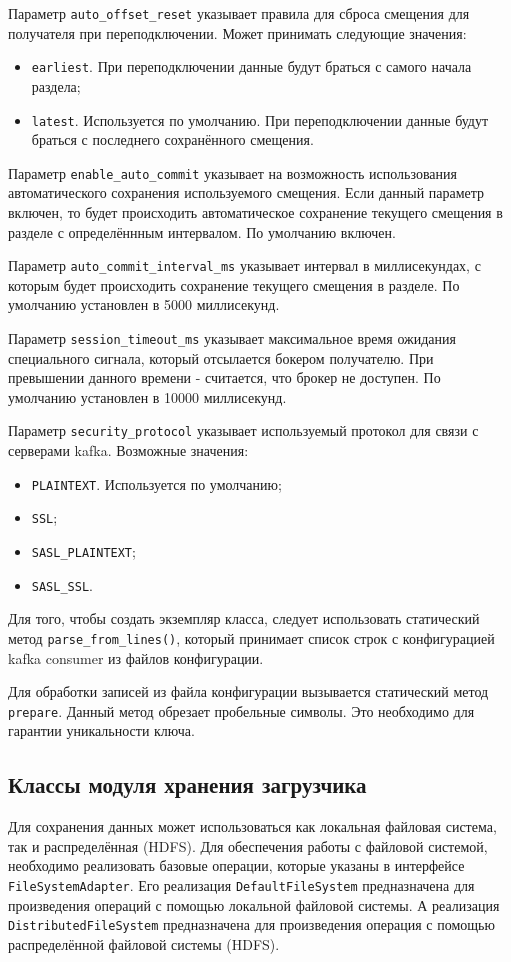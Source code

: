Параметр \texttt{auto\_offset\_reset} указывает правила для сброса смещения для получателя при переподключении.
Может принимать следующие значения:
\begin{itemize}
    \item \texttt{earliest}. При переподключении данные будут браться с самого начала раздела;
    \item \texttt{latest}. Используется по умолчанию. При переподключении данные будут браться с последнего сохранённого смещения.   
\end{itemize}

Параметр \texttt{enable\_auto\_commit} указывает на возможность использования автоматического сохранения используемого смещения.
Если данный параметр включен, то будет происходить автоматическое сохранение текущего смещения в разделе с определённным интервалом.
По умолчанию включен.

Параметр \texttt{auto\_commit\_interval\_ms} указывает интервал в миллисекундах, с которым будет происходить сохранение текущего смещения в разделе.
По умолчанию установлен в 5000 миллисекунд.

Параметр \texttt{session\_timeout\_ms} указывает максимальное время ожидания специального сигнала, который отсылается бокером получателю.
При превышении данного времени - считается, что брокер не доступен.
По умолчанию установлен в 10000 миллисекунд.

Параметр \texttt{security\_protocol} указывает используемый протокол для связи с серверами kafka.
Возможные значения:
\begin{itemize}
    \item \texttt{PLAINTEXT}. Используется по умолчанию;
    \item \texttt{SSL};
    \item \texttt{SASL\_PLAINTEXT};
    \item \texttt{SASL\_SSL}.
\end{itemize}

Для того, чтобы создать экземпляр класса, следует использовать статический метод \texttt{parse\_from\_lines()}, который принимает список строк с конфигурацией kafka consumer из файлов конфигурации.

Для обработки записей из файла конфигурации вызывается статический метод \texttt{prepare}.
Данный метод обрезает пробельные символы.
Это необходимо для гарантии уникальности ключа.

\subsection{Классы модуля хранения загрузчика}
Для сохранения данных может использоваться как локальная файловая система, так и распределённая (HDFS).
Для обеспечения работы с файловой системой, необходимо реализовать базовые операции, которые указаны в интерфейсе \texttt{FileSystemAdapter}.
Его реализация \texttt{DefaultFileSystem} предназначена для произведения операций с помощью локальной файловой системы.
А реализация \texttt{DistributedFileSystem} предназначена для произведения операция с помощью распределённой файловой системы (HDFS).

